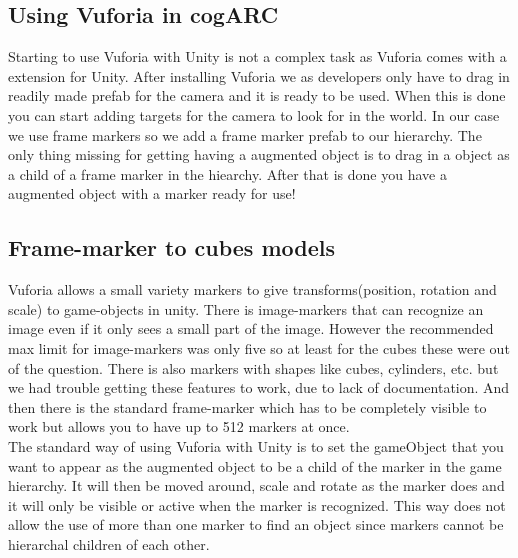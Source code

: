 

\subsection{Using Vuforia in cogARC}
\label{subsec:usingVuforiaincogARC}
Starting to use Vuforia with Unity is not a complex task as Vuforia comes with a extension for Unity.
After installing Vuforia we as developers only have to drag in readily made \gls{prefab} for the camera and it is ready to be used.
When this is done you can start adding targets for the camera to look for in the world.
In our case we use frame markers so we add a frame marker prefab to our hierarchy.
The only thing missing for getting having a augmented object is to drag in a object as a child of a frame marker in the hiearchy.
After that is done you have a augmented object with a marker ready for use!

\subsection{Frame-marker to cubes models}
\label{subsec:framemarker_model} 
Vuforia allows a small variety markers to give transforms(position, rotation and scale) to game-objects in unity. 
There is image-markers that can recognize an image even if it only sees a small part of the image. 
However the recommended max limit for image-markers was only five so at least for the cubes these were out of the question. 
There is also markers with shapes like cubes, cylinders, etc. but we had trouble getting these features to work, due to lack of documentation. 
And then there is the standard frame-marker which has to be completely visible to work but allows you to have up to 512 markers at once.\\
The standard way of using Vuforia with Unity is to set the gameObject that you want to appear as the augmented object to be a child of the marker in the game hierarchy. 
It will then be moved around, scale and rotate as the marker does and it will only be visible or active when the marker is recognized. 
This way does not allow the use of more than one marker to find an object since markers cannot be hierarchal children of each other. 

